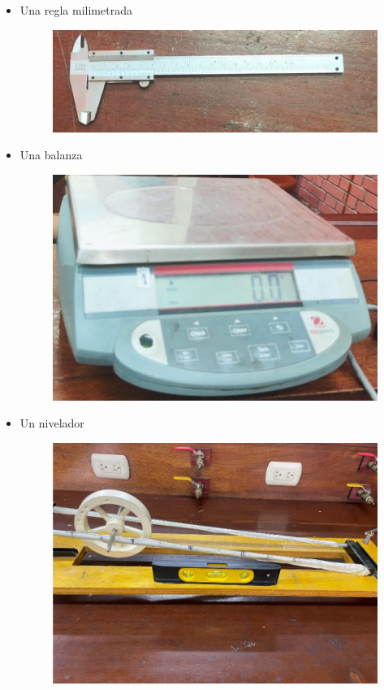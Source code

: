 \documentclass[10pt]{article}
\begin{document}
\begin{itemize}
\begin{figure}[H]
\end{figure}
  \item Una regla milimetrada
\begin{figure}[H]
    \centering
\includegraphics[scale = 0.40, center]{vernier}
\end{figure}
  \item Una balanza
\begin{figure}[H]
    \centering
\includegraphics[scale = 0.40, center]{balanza}
\end{figure}
  \item Un nivelador
\begin{figure}[H]
    \centering
\includegraphics[scale = 0.40, center]{nivel}
\end{figure}
\end{itemize}
\end{document}
